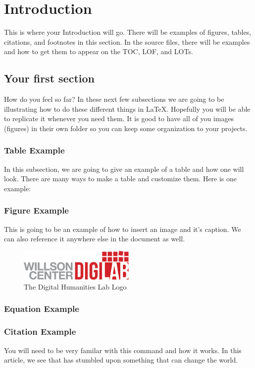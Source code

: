 \documentclass[./dissertation.tex]{subfiles}
\begin{document}
    \chapter{Introduction}
    This is where your Introduction will go. There will be examples of figures, tables, citations, and footnotes in this section. In the source files, there will be examples and how to get them to appear on the TOC, LOF, and LOTs.
    \section{Your first section}
      How do you feel so far? In these next few subsections we are going to be illustrating how to do these different things in LaTeX. Hopefully you will be able to replicate it whenever you need them.
      It is good to have all of you images (figures) in their own folder so you can keep some organization to your projects.

      \subsection{Table Example}
      In this subsection, we are going to give an example of a table and how one will look. There are many ways to make a table and customize them. Here is one example:



      \subsection{Figure Example}
      This is going to be an example of how to insert an image and it's caption. We can also reference it anywhere else in the document as well.
      \begin{figure}[h]
        \centering\includegraphics[width=0.5\textwidth]{figures/digilab_logo}
        \caption{The Digital Humanities Lab Logo}
      \end{figure}



      \subsection{Equation Example}

      \subsection{Citation Example}
      You will need to be very familar with this command and how it works. In this article, we see that \citet{article1} has stumbled upon something that can change the world. 
\end{document}
